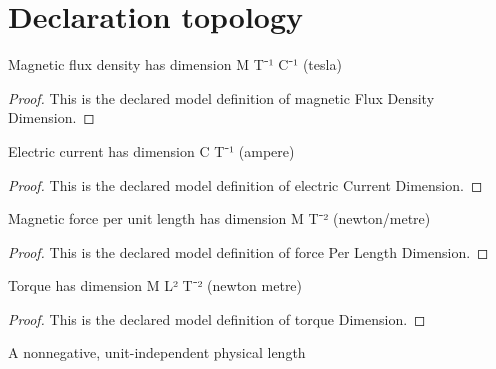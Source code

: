 \section{Declaration topology}
\begin{definition}
  \label{def:physics:phyx-mini-0949:phyxminiproblems-problemphyxmini0949-magneticfluxdensitydimension}
  Magnetic flux density has dimension M T⁻¹ C⁻¹ (tesla)
\end{definition}
\begin{proof}
  This is the declared model definition of magnetic Flux Density Dimension.
\end{proof}
\begin{definition}
  \label{def:physics:phyx-mini-0949:phyxminiproblems-problemphyxmini0949-electriccurrentdimension}
  Electric current has dimension C T⁻¹ (ampere)
\end{definition}
\begin{proof}
  This is the declared model definition of electric Current Dimension.
\end{proof}
\begin{definition}
  \label{def:physics:phyx-mini-0949:phyxminiproblems-problemphyxmini0949-forceperlengthdimension}
  Magnetic force per unit length has dimension M T⁻² (newton/metre)
\end{definition}
\begin{proof}
  This is the declared model definition of force Per Length Dimension.
\end{proof}
\begin{definition}
  \label{def:physics:phyx-mini-0949:phyxminiproblems-problemphyxmini0949-torquedimension}
  Torque has dimension M L² T⁻² (newton metre)
\end{definition}
\begin{proof}
  This is the declared model definition of torque Dimension.
\end{proof}
\begin{definition}
  \label{def:physics:phyx-mini-0949:phyxminiproblems-problemphyxmini0949-lengthquantity}
  A nonnegative, unit-independent physical length
\end{definition}
